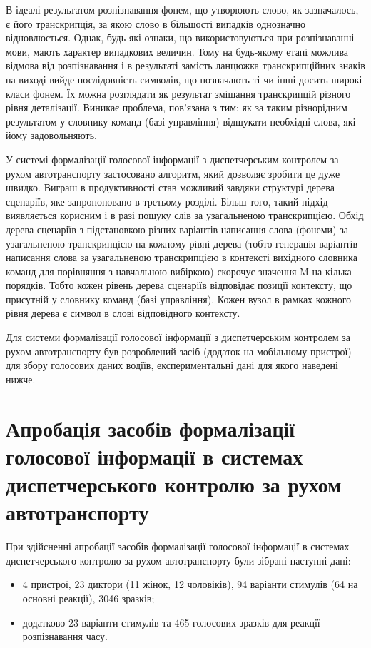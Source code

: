 В ідеалі результатом розпізнавання фонем, що утворюють слово, як зазначалось, є його транскрипція, за якою слово в більшості випадків однозначно відновлюється. Однак, будь-які ознаки, що використовуються при розпізнаванні мови, мають характер випадкових величин. Тому на будь-якому етапі можлива відмова від розпізнавання і в результаті замість ланцюжка транскрипційних знаків на виході вийде послідовність символів, що позначають ті чи інші досить широкі класи фонем. Їх можна розглядати як результат змішання транскрипцій різного рівня деталізації. Виникає проблема, пов’язана з тим: як за таким різнорідним результатом у словнику команд (базі управління) відшукати необхідні слова, які йому задовольняють. 

У системі формалізації голосової інформації з диспетчерським контролем за рухом автотранспорту застосовано алгоритм, який дозволяє зробити це дуже швидко. Виграш в продуктивності став можливий завдяки структурі дерева сценаріїв, яке запропоновано в третьому розділі. Більш того, такий підхід виявляється корисним і в разі пошуку слів за узагальненою транскрипцією. Обхід дерева сценаріїв з підстановкою різних варіантів написання слова (фонеми) за узагальненою транскрипцією на кожному рівні дерева (тобто генерація варіантів написання слова за узагальненою транскрипцією в контексті вихідного словника команд для порівняння з навчальною вибіркою) скорочує значення M на кілька порядків.
Тобто кожен рівень дерева сценаріїв відповідає позиції контексту, що присутній у словнику команд (базі управління). Кожен вузол в рамках кожного рівня дерева є символ в слові відповідного контексту.

Для системи формалізації голосової інформації з диспетчерським контролем за рухом автотранспорту був розроблений засіб (додаток на мобільному пристрої) для збору голосових даних водіїв, експериментальні дані для якого наведені нижче.

\section{Апробація засобів формалізації голосової інформації в системах диспетчерського контролю за рухом автотранспорту} \label{sect4_2}

При здійсненні апробації засобів формалізації голосової інформації в системах диспетчерського контролю за рухом автотранспорту були зібрані наступні дані:

\begin{itemize}
	\item 4 пристрої, 23 диктори (11 жінок, 12 чоловіків), 94 варіанти стимулів (64 на основні реакції), 3046 зразків;
	\item  додатково 23 варіанти стимулів та 465 голосових зразків для реакції розпізнавання часу.
\end{itemize}

